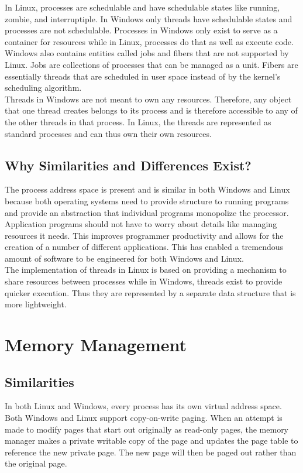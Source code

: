 \documentclass[letterpaper,10pt,titlepage]{article}
\begin{document}
In Linux, processes are schedulable and have schedulable states like running,
zombie, and interruptiple. In Windows only threads have schedulable states and
processes are not schedulable. Processes in Windows only exist to serve as a
container for resources while in Linux, processes do that as well as execute 
code.
\\

Windows also contains entities called jobs and fibers that are not supported 
by Linux. Jobs are collections of processes that can be managed as a unit.
Fibers are essentially threads that are scheduled in user space instead of
by the kernel's scheduling algorithm. 
\\

Threads in Windows are not meant to own any resources. Therefore, any object
that one thread creates belongs to its process and is therefore accessible to 
any of the other threads in that process. In Linux, the threads are represented
as standard processes and can thus own their own resources. 

\subsection{Why Similarities and Differences Exist?}
The process address space is present and is similar in both Windows and Linux
because both operating systems need to provide structure to running programs
and provide an abstraction that individual programs monopolize the processor.
Application programs should not have to worry about details like managing 
resources it needs. This improves programmer productivity and allows for the
creation of a number of different applications. This has enabled a tremendous 
amount of software to be engineered for both Windows and Linux. 
\\
\linebreak
The implementation of threads in Linux is based on providing a mechanism to 
share resources between processes while in Windows, threads exist to provide
quicker execution. Thus they are represented by a separate data structure that 
is more lightweight.

\section{Memory Management}
\subsection{Similarities}
In both Linux and Windows, every process has its own virtual address space.
\\
\linebreak
Both Windows and Linux support copy-on-write paging. When an attempt is made
to modify pages that start out originally as read-only pages, the memory 
manager makes a private writable copy of the page and updates the page table 
to reference the new private page. The new page will then be paged out rather
than the original page.
\end{document}
